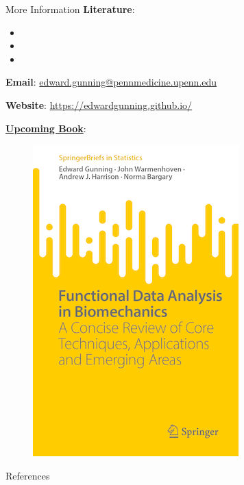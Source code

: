 \documentclass[aspectratio=128,xcolor=dvipsnames, notes]{beamer}
\begin{document}


\begin{frame}{More Information}
\small
   \textbf{Literature}:
   \begin{itemize}
       \item {}
       \item {}
       \item {}
   \end{itemize}
\textbf{Email}: \href{mailto:edward.gunning@pennmedicine.upenn.edu}{edward.gunning@pennmedicine.upenn.edu}



\textbf{Website}: \url{https://edwardgunning.github.io/}

   
   \textbf{\href{https://link.springer.com/book/9783031688614}{Upcoming Book}}:
   \begin{figure}
       \centering
       \includegraphics[width=0.125\linewidth]{figures/book_frontcover.png}
       \label{fig:enter-label}
   \end{figure}
\end{frame}



\begin{frame}[noframenumbering]{References}
       \printbibliography
\end{frame}
\end{document}
